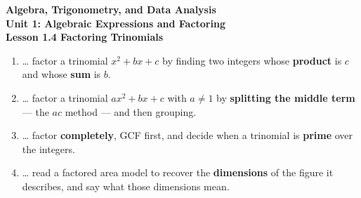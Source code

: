\documentclass[10pt]{article}
\begin{document}
\vspace{-0.8in}

\begin{center}
  {\color{white}\textbf{\LARGE Algebra, Trigonometry, and Data Analysis}}\\[4pt]
  {\color{mistmid}\large\textbf{Unit 1: Algebraic Expressions and Factoring}}\\[6pt]
  {\color{white}\textbf{\large Lesson 1.4 \quad Factoring Trinomials}}
\end{center}

\vspace{0.22in}
\namedateperiod
\vspace{0.18in}

\begin{learningtargetbox}
\small
\begin{enumerate}[leftmargin=1.5em, itemsep=5pt]
  \item \ldots{} factor a trinomial $x^2+bx+c$ by finding two integers whose \textbf{product} is
        $c$ and whose \textbf{sum} is $b$.
  \item \ldots{} factor a trinomial $ax^2+bx+c$ with $a \ne 1$ by \textbf{splitting the middle
        term} --- the $ac$ method --- and then grouping.
  \item \ldots{} factor \textbf{completely}, GCF first, and decide when a trinomial is
        \textbf{prime} over the integers.
  \item \ldots{} read a factored area model to recover the \textbf{dimensions} of the figure it
        describes, and say what those dimensions mean.
\end{enumerate}
\end{learningtargetbox}

\vspace{0.14in}
\end{document}
